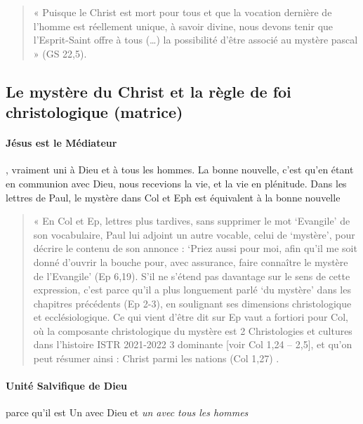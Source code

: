     \begin{quote}
            «  Puisque  le  Christ  est  mort  pour  tous  et  que  la  vocation  dernière  de  l’homme  est  réellement unique,  à  savoir  divine,  nous  devons  tenir  que  l’Esprit-Saint  offre  à  tous  (…)  la  possibilité d’être  associé  au mystère  pascal  »  (GS  22,5). 
    \end{quote}

     
  
    
\subsection{Le mystère du Christ et la règle de foi christologique
    (matrice)}
    
  
     \paragraph{Jésus est le Médiateur}, vraiment uni à Dieu et à tous les hommes. La bonne nouvelle, c'est qu'en étant en communion avec Dieu, nous recevions la vie, et la vie en plénitude. Dans les lettres de Paul, le mystère dans Col et Eph est équivalent à la bonne nouvelle
     
     \begin{quote}
         «  En  Col  et  Ep,  lettres  plus  tardives,  sans  supprimer  le  mot  ‘Evangile’  de  son  vocabulaire, Paul  lui  adjoint  un  autre  vocable,  celui  de  ‘mystère’,  pour  décrire  le  contenu  de  son  annonce  : ‘Priez  aussi  pour  moi,  afin  qu’il  me  soit  donné  d’ouvrir  la  bouche  pour,  avec  assurance,  faire connaître  le  mystère  de  l’Evangile’  (Ep  6,19).  S’il  ne  s’étend  pas  davantage  sur  le  sens  de cette  expression,  c’est  parce  qu’il  a  plus  longuement  parlé  ‘du  mystère’  dans  les  chapitres précédents  (Ep  2-3),  en  soulignant  ses  dimensions  christologique  et  ecclésiologique.  Ce  qui vient  d’être  dit  sur  Ep  vaut  a  fortiori  pour  Col,  où  la  composante  christologique  du  mystère  est 2 Christologies  et  cultures  dans  l’histoire  ISTR  2021-2022 3 dominante  [voir  Col  1,24  –  2,5],  et  qu’on  peut  résumer  ainsi  :  Christ  parmi  les  nations  (Col 1,27) . 
     \end{quote}
    
     
     \paragraph{Unité Salvifique de Dieu} parce qu'il est Un avec Dieu et \textit{un avec tous les hommes}
     
